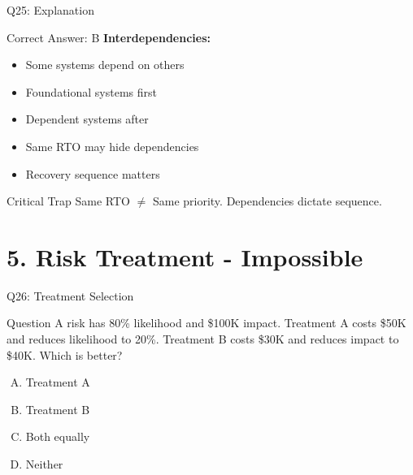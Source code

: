 \documentclass{beamer}
\begin{document}
			\begin{frame}{Q25: Explanation}
				\begin{block}{Correct Answer: B}
					\textbf{Interdependencies:}
					\begin{itemize}
						\item Some systems depend on others
						\item Foundational systems first
						\item Dependent systems after
						\item Same RTO may hide dependencies
						\item Recovery sequence matters
					\end{itemize}
				\end{block}
				\begin{alertblock}{Critical Trap}
					Same RTO $\neq$ Same priority. Dependencies dictate sequence.
				\end{alertblock}
			\end{frame}
			
			\section{5. Risk Treatment - Impossible}
			\begin{frame}{Q26: Treatment Selection}
				\begin{block}{Question}
					A risk has 80\% likelihood and \$100K impact. Treatment A costs \$50K and reduces likelihood to 20\%. Treatment B costs \$30K and reduces impact to \$40K. Which is better?
				\end{block}
				\begin{enumerate}[(A)]
					\item Treatment A
					\item Treatment B
					\item Both equally
					\item Neither
				\end{enumerate}
			\end{frame}
			
\end{document}
